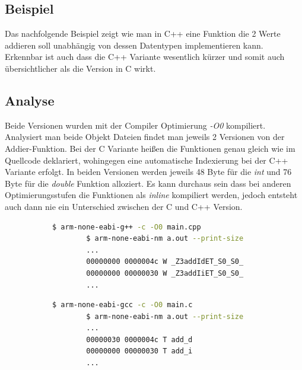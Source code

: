\documentclass[MES,Master,ngerman]{twbook}%
\begin{document}
\subsection{Beispiel}
Das nachfolgende Beispiel zeigt wie man in C++ eine Funktion die 2 Werte addieren soll unabhängig von dessen Datentypen implementieren kann. Erkennbar ist auch dass die C++ Variante wesentlich kürzer und somit auch übersichtlicher als die Version in C wirkt.
\begin{figure}[!htb]
	\begin{subfigure}[b]{0.5\textwidth}
		
		\label{fig:5}
	\end{subfigure}
	\begin{subfigure}[b]{0.5\textwidth}
		
		\label{fig:6}
	\end{subfigure}
\end{figure}
\subsection{Analyse}

Beide Versionen wurden mit der Compiler Optimierung \textit{-O0} kompiliert. Analysiert man beide Objekt Dateien findet man jeweils 2 Versionen von der Addier-Funktion. Bei der C Variante heißen die Funktionen genau gleich wie im Quellcode deklariert, wohingegen eine automatische Indexierung bei der C++ Variante erfolgt. In beiden Versionen werden jeweils 48 Byte für die \textit{int} und 76 Byte für die \textit{double} Funktion alloziert. Es kann durchaus sein dass bei anderen Optimierungsstufen die Funktionen als \textit{inline} kompiliert werden, jedoch entsteht auch dann nie ein Unterschied zwischen der C und C++ Version.


\begin{figure}[!htb]
	\begin{subfigure}[b]{0.5\textwidth}
		\begin{lstlisting}[gobble=6, title={Analyse C++}, language=bash, numbers=none]
		$ arm-none-eabi-g++ -c -O0 main.cpp
		$ arm-none-eabi-nm a.out --print-size
		...
		00000000 0000004c W _Z3addIdET_S0_S0_
		00000000 00000030 W _Z3addIiET_S0_S0_
		...
		\end{lstlisting}
	\end{subfigure}
	\begin{subfigure}[b]{0.5\textwidth}
		\begin{lstlisting}[gobble=6, title={Analyse C}, language=bash, numbers=none]
		$ arm-none-eabi-gcc -c -O0 main.c
		$ arm-none-eabi-nm a.out --print-size
		...
		00000030 0000004c T add_d
		00000000 00000030 T add_i
		...
		\end{lstlisting}
	\end{subfigure}
\end{figure}
\end{document}
